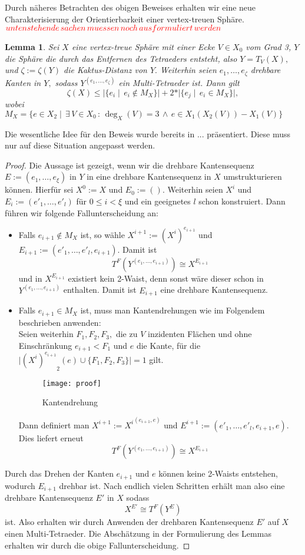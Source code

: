 \documentclass[12pt,titlepage,twoside,cleardoublepage]{article}
\theoremstyle{nummermitklammern}
\newtheorem{lemma}[temp]{Lemma}
\newtheorem{lemma}[zahl]{Lemma}
\numberwithin{equation}{section}
\begin{document}
Durch näheres Betrachten des obigen Beweises erhalten wir eine neue Charakterisierung der Orientierbarkeit einer vertex-treuen Sphäre.
\newpage
$\textcolor{red}{untenstehende\, sachen\, muessen\, noch\, ausformuliert\, werden}$
\begin{lemma}
Sei $X$ eine vertex-treue Sphäre mit einer Ecke $V\in X_0$ vom Grad 3,  $Y$ die Sphäre die durch das Entfernen des Tetraeders entsteht, also $Y=T_V(X),$ und $\zeta:=\zeta(Y)$ die Kaktus-Distanz von $Y.$ Weiterhin seien $e_1,\ldots,e_{\zeta}$ drehbare Kanten in $Y,$ sodass $Y^{(e_1,\ldots,e_{\zeta})}$ ein Multi-Tetraeder ist. Dann gilt
\[
\zeta(X)\leq \vert\{e_i\mid \, e_i \notin M_X\}\vert+2*\vert \{e_j\mid \, e_i \in M_X\}\vert,
\]
wobei $M_X=\{e\in X_2\mid \,\exists\,V\in X_0\, :\, \deg_X(V)=3 \, \wedge \, e \in X_1(X_2(V))-X_1(V) \}$
\end{lemma}
Die wesentliche Idee für den Beweis wurde bereits in ... präsentiert. Diese muss nur auf diese Situation angepasst werden.
\begin{proof}
Die Aussage ist gezeigt, wenn wir die drehbare Kantensequenz $E:=(e_1,\ldots,e_{\xi})$ in $Y$ in eine drehbare Kantensequenz in $X$ umstrukturieren können. Hierfür sei $X^0:=X$ und $E_0:=().$ Weiterhin seien $X^i$ und $E_i:=(e'_1,\ldots,e'_l)$ für $0\leq i < \xi$ und ein geeignetes $l$ schon konstruiert. Dann führen wir folgende Fallunterscheidung an:
\begin{itemize}
\item Falls $e_{i+1} \notin M_X $ ist, so wähle $X^{i+1}:={(X^i)}^{e_{i+1}}$ und $E_{i+1}:=(e'_1,\ldots,e'_l,e_{i+1})$. Damit ist 
\[
T^F(Y^{(e_1,\ldots,e_{i+1})})\cong X^{E_{i+1}}
\]
und in $X^{E_{i+1}}$ existiert kein 2-Waist, denn sonst wäre dieser schon in $Y^{(e_1,\ldots,e_{i+1})}$ enthalten. Damit ist $E_{i+1}$ eine drehbare Kantensequenz.
\item Falls $e_{i+1}\in M_X$ ist, muss man Kantendrehungen wie im Folgendem beschrieben anwenden:\\
Seien weiterhin $F_1,F_2,F_3,$ die zu $V$ inzidenten Flächen und ohne Einschränkung $e_{i+1}<F_1$ und $e$ die Kante, für die $\vert {(X^i)^{e_{i+1}}}_2(e)\cup \{F_1,F_2,F_3\}\vert =1$ gilt.
\begin{figure}[H]
\begin{center}
\texttt{[image: proof]}
\end{center}
\caption{Kantendrehung}
\end{figure}
Dann definiert man $X^{i+1}:={X^i}^{(e_{i+1},e)}$ und $E^{i+1}:=(e'_1,\ldots,e'_l,e_{i+1},e).$ Dies liefert erneut
\[
T^F(Y^{(e_1,\ldots,e_{i+1})})\cong X^{E_{i+1}}
\] 
\end{itemize}
 Durch das Drehen der Kanten $e_{i+1}$ und $e$ können keine 2-Waists entstehen, wodurch $E_{i+1}$ drehbar ist.
Nach endlich vielen Schritten erhält man also eine drehbare Kantensequenz $E'$ in $X$ sodass 
\[X^{E'}\cong T^F(Y^E)
\]ist.
Also erhalten wir durch Anwenden der drehbaren Kantensequenz $E'$ auf $X$ einen Multi-Tetraeder. Die Abschätzung in der Formulierung des Lemmas erhalten wir durch die obige Fallunterscheidung.
\end{proof}
\end{document}
